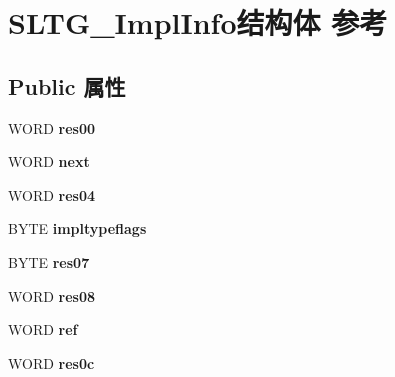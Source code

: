 \hypertarget{struct_s_l_t_g___impl_info}{}\section{S\+L\+T\+G\+\_\+\+Impl\+Info结构体 参考}
\label{struct_s_l_t_g___impl_info}
\subsection*{Public 属性}
\begin{DoxyCompactItemize}
\item 
\mbox{\label{struct_s_l_t_g___impl_info_a4ff8f57b2515f704a4e66ce1d7979384}} 
W\+O\+RD {\bfseries res00}
\item 
\mbox{\label{struct_s_l_t_g___impl_info_a6d04da11fba12b51d06097d872cebddb}} 
W\+O\+RD {\bfseries next}
\item 
\mbox{\label{struct_s_l_t_g___impl_info_a48c0a804d1d128000d26c439d7504ba9}} 
W\+O\+RD {\bfseries res04}
\item 
\mbox{\label{struct_s_l_t_g___impl_info_af7b1a2fd068c0a7c13243ac20741313b}} 
B\+Y\+TE {\bfseries impltypeflags}
\item 
\mbox{\label{struct_s_l_t_g___impl_info_a04255a0d2813810e6287611e476db771}} 
B\+Y\+TE {\bfseries res07}
\item 
\mbox{\label{struct_s_l_t_g___impl_info_aeaf354f0ed5bb4b19538c231636d8403}} 
W\+O\+RD {\bfseries res08}
\item 
\mbox{\label{struct_s_l_t_g___impl_info_a264d87cb7fd3e30699a901982474dd6d}} 
W\+O\+RD {\bfseries ref}
\item 
\mbox{\label{struct_s_l_t_g___impl_info_aa336e3d057eaecadd782036fe7a373ba}} 
W\+O\+RD {\bfseries res0c}
\item 
\mbox{\label{struct_s_l_t_g___impl_info_ae6df371271f8eb59198a6fbd70883daa}} 

\end{DoxyCompactItemize}
